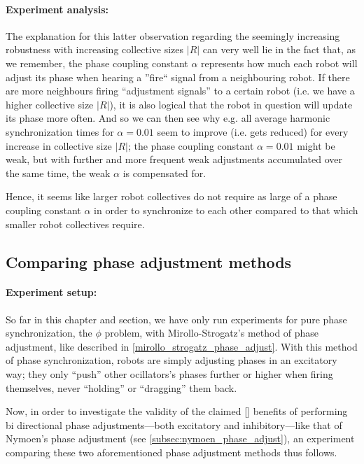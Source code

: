 		\paragraph{Experiment analysis:\nl}
		
		The explanation for this latter observation regarding the seemingly increasing robustness with increasing collective sizes $|R|$ can very well lie in the fact that, as we remember, the phase coupling constant $\alpha$ represents how much each robot will adjust its phase when hearing a ''fire`` signal from a neighbouring robot. If there are more neighbours firing ``adjustment signals'' to a certain robot (i.e. we have a higher collective size $|R|$), it is also logical that the robot in question will update its phase more often. And so we can then see why e.g. all average harmonic synchronization times for $\alpha=0.01$ seem to improve (i.e. gets reduced) for every increase in collective size $|R|$; the phase coupling constant $\alpha=0.01$ might be weak, but with further and more frequent weak adjustments accumulated over the same time, the weak $\alpha$ is compensated for.
		
		Hence, it seems like larger robot collectives do not require as large of a phase coupling constant $\alpha$ in order to synchronize to each other compared to that which smaller robot collectives require.
	
	
	\subsection{Comparing phase adjustment methods}
	
		\paragraph{Experiment setup:\nl}
		
		So far in this chapter and section, we have only run experiments for pure phase synchronization, the $\phi$ problem, with Mirollo-Strogatz's method of phase adjustment, like described in \ref{mirollo_strogatz_phase_adjust}. With this method of phase synchronization, robots are simply adjusting phases in an excitatory way; they only ``push'' other ocillators's phases further or higher when firing themselves, never ``holding'' or ``dragging'' them back.
		
		Now, in order to investigate the validity of the claimed [] benefits of performing bi directional phase adjustments—both excitatory and inhibitory—like that of Nymoen's phase adjustment (see \ref{subsec:nymoen_phase_adjust}), an experiment comparing these two aforementioned phase adjustment methods thus follows.
		
